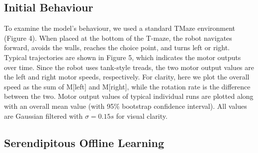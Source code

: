 \documentclass[conference]{IEEEtran}
\begin{document}
\subsection{Initial Behaviour}

To examine the model's behaviour, we used a standard TMaze
environment (Figure 4). When placed at the bottom
of the T-maze, the robot navigates forward, avoids the
walls, reaches the choice point, and turns left or right.
Typical trajectories are shown in Figure 5, which indicates
the motor outputs over time. Since the robot uses tank-style
treads, the two motor output values are the left and right
motor speeds, respectively. For clarity, here we plot the
overall speed as the sum of M[left] and M[right], while
the rotation rate is the difference between the two. Motor output values of typical individual runs are plotted along
with an overall mean value (with 95\% bootstrap confidence
interval). All values are Gaussian filtered with $\sigma=0.15s$ for visual clarity.


\subsection{Serendipitous Offline Learning}
\end{document}
